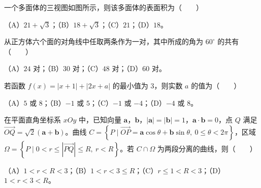 \begin{question}
一个多面体的三视图如图所示，则该多面体的表面积为\mbox{（　　）}

（A）$21+\sqrt3$；（B）$18+\sqrt3$；（C）$21$；（D）$18$。
\nopagebreak[4]
\begin{center}\end{center}
\nopagebreak[4]
\end{question}
\begin{question}
从正方体六个面的对角线中任取两条作为一对，其中所成的角为 $60^\circ$ 的共有\mbox{（　　）}

（A）$24$ 对；（B）$30$ 对；（C）$48$ 对；（D）$60$ 对。

\end{question}
\begin{question}
若函数 $f(x)=|x+1|+|2x+a|$ 的最小值为 $3$，则实数 $a$ 的值为\mbox{（　　）}

（A）$5$ 或 $8$；（B）$-1$ 或 $5$；（C）$-1$ 或 $-4$；（D）$-4$ 或 $8$。

\end{question}
\begin{question}
在平面直角坐标系 $xOy$ 中，已知向量 $\boldsymbol a$，$\boldsymbol b$，$|\boldsymbol a|=|\boldsymbol b|=1$，$\boldsymbol a\cdot\boldsymbol b=0$，点 $Q$ 满足 $\overrightarrow{OQ}=\sqrt2(\boldsymbol a+\boldsymbol b)$。曲线 $C=\left\{P\mid \overrightarrow{OP}=\boldsymbol a\cos\theta+\boldsymbol b\sin\theta,\ 0\leqslant\theta<2\pi\right\}$，区域 $\Omega=\left\{P\mid 0<r\leqslant|\overrightarrow{PQ}|\leqslant R,\ r<R\right\}$。若 $C\cap\Omega$ 为两段分离的曲线，则\mbox{（　　）}

（A）$1<r<R<3$；（B）$1<r<3\leqslant R$；（C）$r\leqslant1<R<3$；（D）$1<r<3<R$。

\end{question}

